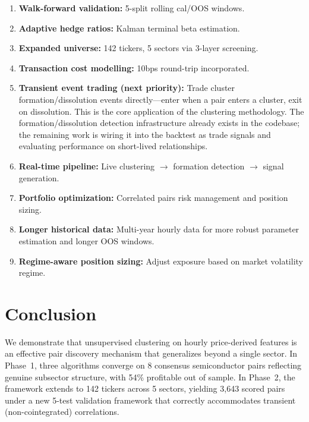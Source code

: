 \documentclass[11pt, a4paper]{article}
\begin{document}
\begin{enumerate}
    \item[$\checkmark$] \textbf{Walk-forward validation:} 5-split rolling cal/OOS windows.
    \item[$\checkmark$] \textbf{Adaptive hedge ratios:} Kalman terminal beta estimation.
    \item[$\checkmark$] \textbf{Expanded universe:} 142 tickers, 5 sectors via 3-layer screening.
    \item[$\checkmark$] \textbf{Transaction cost modelling:} 10bps round-trip incorporated.
    \item \textbf{Transient event trading (next priority):} Trade cluster formation/dissolution events directly---enter when a pair enters a cluster, exit on dissolution. This is the core application of the clustering methodology. The formation/dissolution detection infrastructure already exists in the codebase; the remaining work is wiring it into the backtest as trade signals and evaluating performance on short-lived relationships.
    \item \textbf{Real-time pipeline:} Live clustering $\to$ formation detection $\to$ signal generation.
    \item \textbf{Portfolio optimization:} Correlated pairs risk management and position sizing.
    \item \textbf{Longer historical data:} Multi-year hourly data for more robust parameter estimation and longer OOS windows.
    \item \textbf{Regime-aware position sizing:} Adjust exposure based on market volatility regime.
\end{enumerate}

\section{Conclusion}

We demonstrate that unsupervised clustering on hourly price-derived features is an effective pair discovery mechanism that generalizes beyond a single sector. In Phase~1, three algorithms converge on 8 consensus semiconductor pairs reflecting genuine subsector structure, with 54\% profitable out of sample. In Phase~2, the framework extends to 142 tickers across 5 sectors, yielding 3,643 scored pairs under a new 5-test validation framework that correctly accommodates transient (non-cointegrated) correlations.
\end{document}
